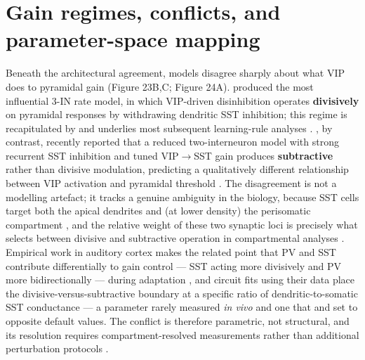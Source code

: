 \documentclass[11pt]{article}
\let\origrightarrow\rightarrow
\def\rightarrow{\ensuremath{\origrightarrow}}
\begin{document}
\section{Gain regimes, conflicts, and parameter-space mapping}

Beneath the architectural agreement, models disagree sharply about what VIP does to pyramidal gain (Figure 23B,C; Figure 24A). \citet{Hertag2019} produced the most influential 3-IN rate model, in which VIP-driven disinhibition operates \textbf{divisively} on pyramidal responses by withdrawing dendritic SST inhibition; this regime is recapitulated by \citep{Litwinkumar2016, Veit2023} and underlies most subsequent learning-rule analyses \citep{Lee2025, Hertag2020, Hertag2021}. \citet{Tahvili2025b}, by contrast, recently reported that a reduced two-interneuron model with strong recurrent SST inhibition and tuned VIP\rightarrow SST gain produces \textbf{subtractive} rather than divisive modulation, predicting a qualitatively different relationship between VIP activation and pyramidal threshold \citep{Tahvili2025a}. The disagreement is not a modelling artefact; it tracks a genuine ambiguity in the biology, because SST cells target both the apical dendrites and (at lower density) the perisomatic compartment \citep{Hioki2013}, and the relative weight of these two synaptic loci is precisely what selects between divisive and subtractive operation in compartmental analyses \citep{Jadi2012, Dorsett2021, Pedrosa2020}. Empirical work in auditory cortex makes the related point that PV and SST contribute differentially to gain control --- SST acting more divisively and PV more bidirectionally --- during adaptation \citep{Natan2017}, and circuit fits using their data place the divisive-versus-subtractive boundary at a specific ratio of dendritic-to-somatic SST conductance --- a parameter rarely measured \textit{in vivo} and one that \citet{Tahvili2025a} and \citet{Hertag2019} set to opposite default values. The conflict is therefore parametric, not structural, and its resolution requires compartment-resolved measurements rather than additional perturbation protocols \citep{Bilash2023, Lenkey2025, Reimann2026}.
\end{document}
